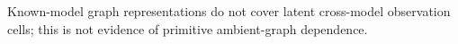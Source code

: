 Known-model graph representations do not cover latent cross-model observation cells; this is not evidence of primitive ambient-graph dependence.